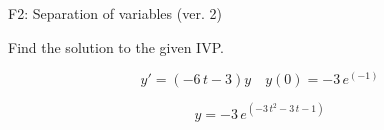\begin{exercise}
  \begin{exerciseTitle}F2: Separation of variables (ver. 2)\end{exerciseTitle}
  \begin{exerciseStatement}
    
Find the solution to the given IVP.

    
\[y'=( -6 \, t - 3 )y\hspace{1em} y(0)= -3 \, e^{\left(-1\right)}\]

  \end{exerciseStatement}
  \begin{exerciseAnswer}
    
\[y= -3 \, e^{\left(-3 \, t^{2} - 3 \, t - 1\right)}\]

  \end{exerciseAnswer}
\end{exercise}